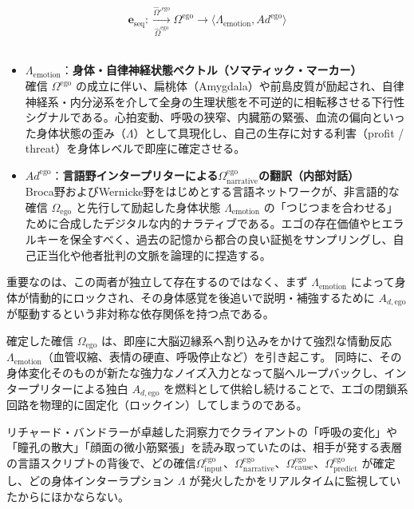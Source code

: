 \begin{equation}
    \boldsymbol{e}_{\mathrm{seq}} 
    :\xrightarrow[\hat{\Omega}^{\mathrm{ego}}]{\hat{\Omega}'^{\mathrm{ego}}} \Omega^{\mathrm{ego}} 
\xrightarrow{} \langle \Lambda_{\mathrm{emotion}}, Ad^{\mathrm{ego}} \rangle \end{equation}
\
\begin{itemize}
    \item $\Lambda_{\mathrm{emotion}}$：\textbf{身体・自律神経状態ベクトル（ソマティック・マーカー）} \\
    確信 $\Omega^{\mathrm{ego}}$ の成立に伴い、扁桃体（Amygdala）や前島皮質が励起され、自律神経系・内分泌系を介して全身の生理状態を不可逆的に相転移させる下行性シグナルである。心拍変動、呼吸の狭窄、内臓筋の緊張、血流の偏向といった身体状態の歪み（$\Lambda$）として具現化し、自己の生存に対する利害（profit / threat）を身体レベルで即座に確定させる。

\item $Ad^{\mathrm{ego}}$：\textbf{言語野インタープリターによる$\Omega^{\mathrm{ego}}_{\mathrm{narrative}}$の翻訳（内部対話）} \\
    Broca野およびWernicke野をはじめとする言語ネットワークが、非言語的な確信 $\Omega_{\mathrm{ego}}$ と先行して励起した身体状態 $\Lambda_{\mathrm{emotion}}$ の「つじつまを合わせる」ために合成したデジタルな内的ナラティブである。エゴの存在価値やヒエラルキーを保全すべく、過去の記憶から都合の良い証拠をサンプリングし、自己正当化や他者批判の文脈を論理的に捏造する。
\end{itemize}

重要なのは、この両者が独立して存在するのではなく、まず $\Lambda_{\mathrm{emotion}}$ によって身体が情動的にロックされ、その身体感覚を後追いで説明・補強するために $A_{d,\mathrm{ego}}$ が駆動するという非対称な依存関係を持つ点である。




確定した確信 $\Omega_{\mathrm{ego}}$ は、即座に大脳辺縁系へ割り込みをかけて強烈な情動反応 $\Lambda_{\mathrm{emotion}}$（血管収縮、表情の硬直、呼吸停止など）を引き起こす。
同時に、その身体変化そのものが新たな強力なノイズ入力となって脳へループバックし、インタープリターによる独白 $A_{d,\mathrm{ego}}$ を燃料として供給し続けることで、エゴの閉鎖系回路を物理的に固定化（ロックイン）してしまうのである。

リチャード・バンドラーが卓越した洞察力でクライアントの「呼吸の変化」や「瞳孔の散大」「顔面の微小筋緊張」を読み取っていたのは、相手が発する表層の言語スクリプトの背後で、どの確信$\Omega^{\mathrm{ego}}_{\mathrm{input}}$、$\Omega^{\mathrm{ego}}_{\mathrm{narrative}}$、$\Omega^{\mathrm{ego}}_{\mathrm{cause}}$、$\Omega^{\mathrm{ego}}_{\mathrm{predict}}$ が確定し、どの身体インターラプション $\Lambda$ が発火したかをリアルタイムに監視していたからにほかならない。



